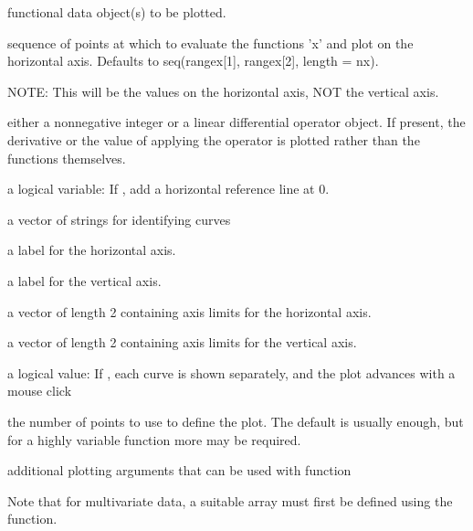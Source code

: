 \documentclass{article}
\begin{document}
\begin{Arguments}
\begin{ldescription}
\item[\code{x}] functional data object(s) to be plotted.

\item[\code{y}] sequence of points at which to evaluate the functions 'x' and plot
on the horizontal axis.  Defaults to seq(rangex[1], rangex[2],
length = nx).

NOTE:  This will be the values on the horizontal axis, NOT the
vertical axis.  

\item[\code{Lfdobj}] either a nonnegative integer or a linear differential operator
object. If present, the derivative or the value of applying the
operator is plotted rather than the functions themselves.

\item[\code{href}] a logical variable:  If , add a horizontal reference line
at 0.  

\item[\code{titles}] a vector of strings for identifying curves

\item[\code{xlab}] a label for the horizontal axis.

\item[\code{ylab}] a label for the vertical axis.

\item[\code{xlim}] a vector of length 2 containing axis limits for the horizontal axis.

\item[\code{ylim}] a vector of length 2 containing axis limits for the vertical axis.

\item[\code{ask}] a logical value:  If , each curve is shown separately, and
the plot advances with a mouse click

\item[\code{nx}] the number of points to use to define the plot.  The default is
usually enough, but for a highly variable function more may be
required.

\item[\code{... }] additional plotting arguments that can be used with function

\end{ldescription}
\end{Arguments}
\begin{Details}\relax
Note that for multivariate data, a
suitable array must first be defined using the  function.
\end{Details}
\end{document}
